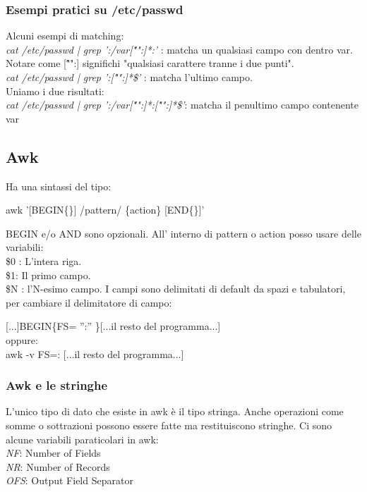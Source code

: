 \documentclass[a4paper,12pt]{article} %
\begin{document}
\begin{description}
\subsubsection{Esempi pratici su /etc/passwd}
Alcuni esempi di matching:\\
\textit{cat /etc/passwd | grep ':/var[\^"":]*:'} : matcha un qualsiasi campo con dentro var. Notare come [\^"":] significhi "qualsiasi carattere tranne i due punti".\\
\textit{cat /etc/passwd | grep ':[\^"":]*\$'} : matcha l'ultimo campo.\\
Uniamo i due risultati: \\
\textit{cat /etc/passwd | grep ':/var[\^"":]*:[\^"":]*\$'}: matcha il penultimo campo contenente var
\end{description}

\subsection{Awk}
Ha una sintassi del tipo:\\
\begin{center}
awk '[BEGIN\{\}] /pattern/ \{action\} [END\{\}]'
\end{center}
BEGIN e/o AND sono opzionali.
All' interno di pattern o action posso usare delle variabili:\\
\$0 : L'intera riga.\\
\$1: Il primo campo.\\
\$N : l'N-esimo campo.
I campi sono delimitati di default da spazi e tabulatori, per cambiare il delimitatore di campo:
\begin{center}
[...]BEGIN\{FS= '':'' \}[...il resto del programma...]\\
oppure:\\
awk -v FS=: [...il resto del programma...]
\end{center}
\subsubsection{Awk e le stringhe}
L'unico tipo di dato che esiste in awk è il tipo stringa. Anche operazioni come somme o sottrazioni possono essere fatte ma restituiscono stringhe.
Ci sono alcune variabili paraticolari in awk:\\
\textit{NF}: Number of Fields\\
\textit{NR}: Number of Records\\
\textit{OFS}: Output Field Separator\\
\end{document}
